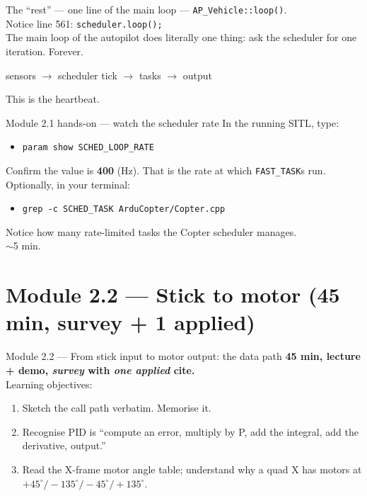\documentclass[aspectratio=169,11pt]{beamer}
\begin{document}
\begin{frame}{The ``rest'' --- one line of the main loop}
   --- \texttt{AP\_Vehicle::loop()}.\\[1ex]
  Notice line 561: \texttt{scheduler.loop();}\\[1ex]
  The main loop of the autopilot does literally one thing: ask the scheduler for one iteration. Forever.
  \vfill
  \begin{center}\Large
    sensors $\rightarrow$ scheduler tick $\rightarrow$ tasks $\rightarrow$ output
  \end{center}
  \vfill
  This is the heartbeat.
\end{frame}

\begin{frame}{Module 2.1 hands-on --- watch the scheduler rate}
  In the running SITL, type:
  \begin{itemize}
    \item[\texttt{>}] \texttt{param show SCHED\_LOOP\_RATE}
  \end{itemize}
  Confirm the value is \textbf{400} (Hz). That is the rate at which \texttt{FAST\_TASK}s run.\\[1ex]
  Optionally, in your terminal:
  \begin{itemize}
    \item[\$] \texttt{grep -c SCHED\_TASK ArduCopter/Copter.cpp}
  \end{itemize}
  Notice how many rate-limited tasks the Copter scheduler manages.\\[1ex]
  $\sim$5 min.
\end{frame}

\section{Module 2.2 --- Stick to motor (45 min, survey + 1 applied)}

\begin{frame}{Module 2.2 --- From stick input to motor output: the data path}
  \textbf{45 min, lecture + demo, \emph{survey} with \emph{one applied} cite.}\\[1ex]
  Learning objectives:
  \begin{enumerate}
    \item Sketch the call path verbatim. Memorise it.
    \item Recognise PID is ``compute an error, multiply by P, add the integral, add the derivative, output.''
    \item Read the X-frame motor angle table; understand why a quad X has motors at $+45^\circ / -135^\circ / -45^\circ / +135^\circ$.
  \end{enumerate}
\end{frame}
\end{document}
